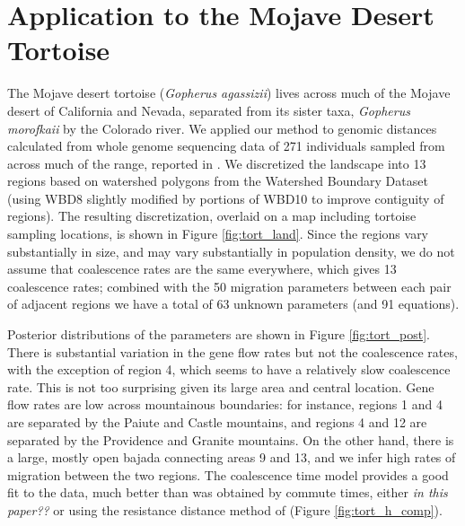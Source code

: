 \documentclass{article}
\newcommand{\plr}[1]{{\em \color{blue} #1}}
\begin{document}
\section*{Application to the Mojave Desert Tortoise}

The Mojave desert tortoise (\textit{Gopherus agassizii})
lives across much of the Mojave desert of California and Nevada,
separated from its sister taxa, \textit{Gopherus morofkaii} by the Colorado river.
We applied our method to genomic distances calculated from
whole genome sequencing data of 271 individuals sampled from across much of the range,
reported in \citet{shaffer2017desert}.
We discretized the landscape into 13 regions based on watershed polygons
from the Watershed Boundary Dataset \citep{WBD}
(using WBD8 slightly modified by portions of WBD10 to improve contiguity of regions).
The resulting discretization,
overlaid on a map including tortoise sampling locations,
is shown in Figure \ref{fig:tort_land}.
Since the regions vary substantially in size, 
and may vary substantially in population density, 
we do not assume that coalescence rates are the same everywhere, 
which gives 13 coalescence rates;
combined with the 50 migration parameters between each pair of adjacent regions
we have a total of 63 unknown parameters
(and 91 equations).

Posterior distributions of the parameters are shown in Figure \ref{fig:tort_post}.
There is substantial variation in the gene flow rates 
but not the coalescence rates, 
with the exception of region 4, which seems to have a relatively slow coalescence rate.
This is not too surprising given its large area and central location.
Gene flow rates are low across mountainous boundaries:
for instance, regions 1 and 4 are separated by the Paiute and Castle mountains,
and regions 4 and 12 are separated by the Providence and Granite mountains.
On the other hand, there is a large, mostly open bajada connecting areas 9 and 13, 
and we infer high rates of migration between the two regions.
The coalescence time model provides a good fit to the data,
much better than was obtained by commute times, either \plr{in this paper??}
or using the resistance distance method of \citet{shaffer2017desert}
(Figure \ref{fig:tort_h_comp}).
\end{document}
